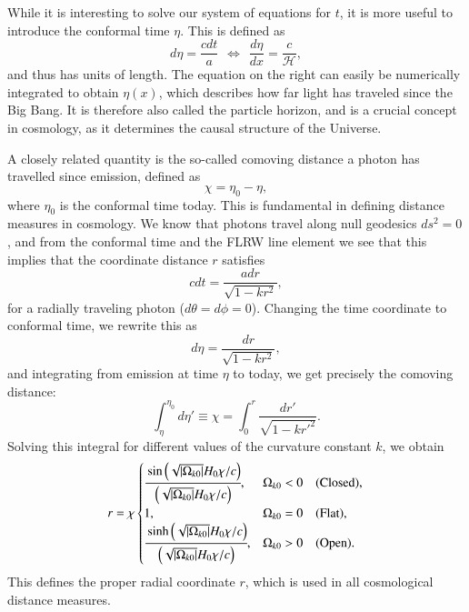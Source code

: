 \documentclass{aa}
\numberwithin{equation}{section}
\numberwithin{table}{section}
\numberwithin{figure}{section}
\begin{document}
While it is interesting to solve our system of equations for $t$, it is more useful to introduce the conformal time $\eta$. This is defined as
\begin{equation}
d\eta = \frac{cdt}{a} \hspace{5pt}\Leftrightarrow\hspace{5pt}\frac{d\eta}{dx} = \frac{c}{\mathcal{H}}, \label{eq: eta}
\end{equation}
and thus has units of length. The equation on the right can easily be numerically integrated to obtain $\eta(x)$, which describes how far light has traveled since the Big Bang. It is therefore also called the particle horizon, and is a crucial concept in cosmology, as it determines the causal structure of the Universe. 


A closely related quantity is the so-called comoving distance a photon has travelled since emission, defined as
\begin{equation}
  \chi = \eta_0 - \eta,
\end{equation}
where $\eta_0$ is the conformal time today. This is fundamental in defining distance measures in cosmology. We know that photons travel along null geodesics $ds^2 = 0$, and from the conformal time and the FLRW line element we see that this implies that the coordinate distance $r$ satisfies
\begin{equation}
  c dt = \frac{adr}{\sqrt{1 - k r^2}},
\end{equation}
for a radially traveling photon ($d\theta = d\phi = 0$). Changing the time coordinate to conformal time, we rewrite this as
\begin{equation}
  d\eta = \frac{dr}{\sqrt{1 - k r^2}},
\end{equation}
and integrating from emission at time $\eta$ to today, we get precisely the comoving distance:
\begin{equation}
  \int_{\eta}^{\eta_0}  d\eta' \equiv \chi = \int_{0}^{r} \frac{dr'}{\sqrt{1 - k r'^2}}.
\end{equation}
Solving this integral for different values of the curvature constant $k$, we obtain
\begin{equation}
  r = 
  \chi\begin{cases}
  \cfrac{\sin\left(\sqrt{|\Omega_{k0}|} H_0 \chi / c\right)}{\left(\sqrt{|\Omega_{k0}|} H_0 \chi / c\right)}, & \Omega_{k0} < 0 \quad \text{(Closed)}, \\
1, & \Omega_{k0} = 0 \quad \text{(Flat)}, \\
\cfrac{\sinh\left(\sqrt{|\Omega_{k0}|} H_0 \chi / c\right)}{\left(\sqrt{|\Omega_{k0}|} H_0 \chi / c\right)}, & \Omega_{k0} > 0 \quad \text{(Open)}.
\end{cases}
\end{equation}
This defines the proper radial coordinate $r$, which is used in all cosmological distance measures. 
\end{document}
